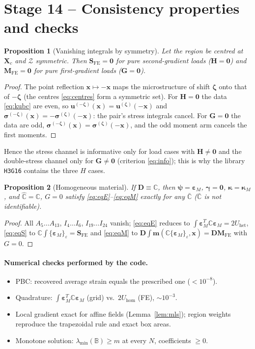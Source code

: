 \documentclass[11pt,a4paper]{article}
\newcommand{\C}{\mathbb{C}}                     %
\newcommand{\Cb}{\bar{\mathbb{C}}}              %
\newcommand{\Ch}{\hat{\mathbb{C}}}              %
\newcommand{\Dm}{\mathbf{D}}                    %
\newcommand{\B}{\mathbb{B}}                     %
\newcommand{\epsM}{\bm{\varepsilon}_{M}}
\newcommand{\bpsi}{\bm{\psi}}
\newcommand{\bgam}{\bm{\gamma}}
\newcommand{\bkap}{\bm{\kappa}}
\newcommand{\bsig}{\bm{\sigma}}
\newcommand{\bx}{\bm{x}}
\newcommand{\bX}{\bm{X}}
\newcommand{\bu}{\bm{u}}
\newcommand{\bH}{\bm{H}}
\newcommand{\bG}{\bm{G}}
\newcommand{\ve}[1]{\{#1\}_{\varepsilon}}      %
\newcommand{\Zset}{\mathcal{Z}}
\newcommand{\code}[1]{\texttt{#1}}
\theoremstyle{plain}
\newtheorem{proposition}{Proposition}
\theoremstyle{remark}
\begin{document}
\section{Stage 14 -- Consistency properties and checks}
\label{sec:stage14}

\begin{proposition}[Vanishing integrals by symmetry]
\label{prop:sym}
Let the region be centred at $\bX_c$ and $\Zset$ symmetric. Then $\bm S_{\mathrm{FE}}=\bm0$ for pure
second-gradient loads ($\bH=\bm0$) and $\bm M_{\mathrm{FE}}=\bm0$ for pure first-gradient loads
($\bG=\bm0$).
\end{proposition}
\begin{proof}
The point reflection $\bx\mapsto-\bx$ maps the microstructure of shift $\bm\zeta$ onto that of
$-\bm\zeta$ (the centres \eqref{eq:centres} form a symmetric set). For $\bH=\bm0$ the data
\eqref{eq:kubc} are even, so $\bu^{(-\bm\zeta)}(\bx)=\bu^{(\bm\zeta)}(-\bx)$ and
$\bsig^{(-\bm\zeta)}(\bx)=-\bsig^{(\bm\zeta)}(-\bx)$: the pair's stress integrals cancel. For
$\bG=\bm0$ the data are odd, $\bsig^{(-\bm\zeta)}(\bx)=\bsig^{(\bm\zeta)}(-\bx)$, and the odd
moment arm cancels the first moments.
\end{proof}
\noindent Hence the stress channel is informative only for load cases with $\bH\ne\bm0$ and the
double-stress channel only for $\bG\ne\bm0$ (criterion \eqref{eq:info}); this is why the library
\code{H3G16} contains the three $H$ cases.

\begin{proposition}[Homogeneous material]
\label{prop:hom}
If $\Dm\equiv\C$, then $\bpsi=\epsM$, $\bgam=\bm0$, $\bkap=\bkap_M$, and $\Ch=\C$, $G=0$ satisfy
\eqref{eq:eqE}--\eqref{eq:eqM} exactly for any $\Cb$ ($\Cb$ is not identifiable).
\end{proposition}
\begin{proof}
All $A_5\dots A_{13}$, $I_4\dots I_6$, $I_{19}\dots I_{24}$ vanish; \eqref{eq:eqE} reduces to
$\int\epsM^T\C\epsM=2U_{\mathrm{het}}$, \eqref{eq:eqS} to $\C\int\ve{\epsM}=\bm S_{\mathrm{FE}}$ and
\eqref{eq:eqM} to $\bm D\int\bm m(\C\ve{\epsM},\bx)=\bm D\bm M_{\mathrm{FE}}$ with $G=0$.
\end{proof}

\paragraph{Numerical checks performed by the code.}
\begin{itemize}[leftmargin=1.2em]
\item PBC: recovered average strain equals the prescribed one ($<10^{-8}$).
\item Quadrature: $\int\epsM^T\C\epsM$ (grid) vs.\ $2U_{\mathrm{hom}}$ (FE), $\sim10^{-3}$.
\item Local gradient exact for affine fields (Lemma~\ref{lem:mls}); region weights reproduce the
trapezoidal rule and exact box areas.
\item Monotone solution: $\lambda_{\min}(\B)\ge m$ at every $N$, coefficients $\ge0$.
\end{itemize}
\end{document}
